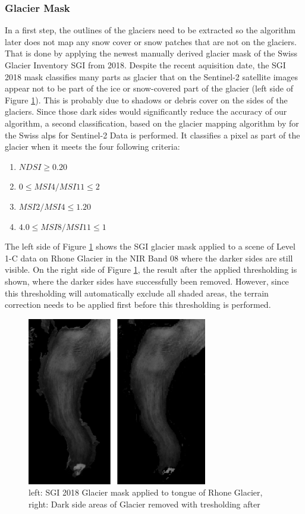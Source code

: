 \documentclass[12pt]{article}
\begin{document}
\subsubsection{Glacier Mask}
In a first step, the outlines of the glaciers need to be extracted so the algorithm later does not map any snow cover or snow patches that are not on the glaciers. That is done by applying the newest manually derived glacier mask of the Swiss Glacier Inventory SGI from 2018. Despite the recent aquisition date, the SGI 2018 mask classifies many parts as glacier that on the Sentinel-2 satellite images appear not to be part of the ice or snow-covered part of the glacier (left side of Figure \ref{fig:glacier_mask}). This is probably due to shadows or debris cover on the sides of the glaciers. Since those dark sides would significantly reduce the accuracy of our algorithm, a second classification, based on the glacier mapping algorithm by  \cite{Paul2016} for the Swiss alps for Sentinel-2 Data is performed. It classifies a pixel as part of the glacier when it meets the four following criteria:
\begin{enumerate}
 \item $NDSI \geq	 0.20$
 \item $0 \leq MSI4/MSI11 \leq 2$
 \item $MSI2/MSI4 \leq 1.20$
 \item $4.	0 \leq MSI8/MSI11 \leq 1$
\end{enumerate}

The left side of Figure \ref{fig:glacier_mask} shows the SGI glacier mask applied to a scene of Level 1-C data on Rhone Glacier in the NIR Band 08 where the darker sides are still visible. On the right side of Figure \ref{fig:glacier_mask}, the result after the applied thresholding is shown, where the darker sides have successfully been removed. 
However, since this thresholding will automatically exclude all shaded areas, the terrain correction needs to be applied first before this thresholding is performed.

\begin{figure}[t]
\centering
\includegraphics[width=0.7\textwidth]{glacier_mask}
\caption{left: SGI 2018 Glacier mask applied to tongue of Rhone Glacier, right: Dark side areas of Glacier removed with tresholding after \cite{Paul2016}}
\label{fig:glacier_mask}
\end{figure}
\end{document}
